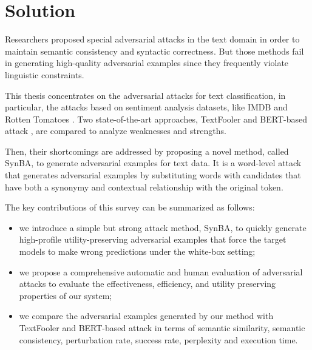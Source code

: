
\section{Solution}\label{sec:solution}
Researchers proposed special adversarial attacks in the text domain in order to maintain semantic consistency and syntactic correctness.
But those methods fail in generating high-quality adversarial examples since they frequently violate linguistic constraints.

This thesis concentrates on the adversarial attacks for text classification, in particular, the attacks based on sentiment analysis datasets, like IMDB \cite{maas-EtAl:2011:ACL-HLT2011} and Rotten Tomatoes \cite{pang-lee:2005a}.
Two state-of-the-art approaches, TextFooler \cite{journals/corr/abs-1907-11932} and BERT-based attack \cite{conf/emnlp/GargR20}, are compared to analyze weaknesses and strengths.

Then, their shortcomings are addressed by proposing a novel method, called SynBA, to generate adversarial examples for text data.
It is a word-level attack that generates adversarial examples by substituting words with candidates that have both a synonymy and contextual relationship with the original token.

The key contributions of this survey can be summarized as follows:
\begin{itemize}
    \item we introduce a simple but strong attack method, SynBA, to quickly generate high-profile utility-preserving adversarial examples that force the target models to make wrong predictions under the white-box setting;
    \item we propose a comprehensive automatic and human evaluation of adversarial attacks to evaluate the effectiveness, efficiency, and utility preserving properties of our system;
    \item we compare the adversarial examples generated by our method with TextFooler and BERT-based attack in terms of semantic similarity, semantic consistency, perturbation rate, success rate, perplexity and execution time.
\end{itemize}



